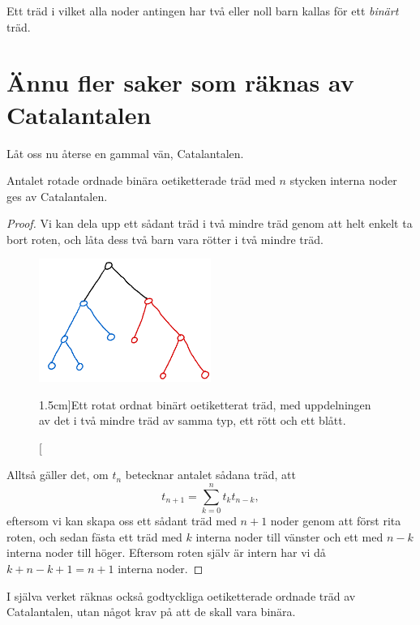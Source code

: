 \documentclass[nobib]{tufte-handout}
\begin{document}
\begin{definition}
    Ett träd i vilket alla noder antingen har två eller noll barn kallas för ett \emph{binärt} träd.
\end{definition}

\section{Ännu fler saker som räknas av Catalantalen}

Låt oss nu återse en gammal vän, Catalantalen.

\begin{proposition}\label{prop:ROBUT_count}
    Antalet rotade ordnade binära oetiketterade träd med $n$ stycken interna noder ges av Catalantalen.

    \begin{proof}
        Vi kan dela upp ett sådant träd i två mindre träd genom att helt enkelt ta bort roten, och låta dess två barn vara rötter i två mindre träd.

        \begin{figure}
            \centering
            \includegraphics[width=0.5\textwidth]{graphics/RUBOTree_division.png}
            \caption[][1.5cm]{Ett rotat ordnat binärt oetiketterat träd, med uppdelningen av det i två mindre träd av samma typ, ett rött och ett blått.}
        \end{figure}

        Alltså gäller det, om $t_n$ betecknar antalet sådana träd, att
        $$t_{n+1} = \sum_{k=0}^{n} t_k t_{n-k},$$
        eftersom vi kan skapa oss ett sådant träd med $n+1$ noder genom att först rita roten, och sedan fästa ett träd med $k$ interna noder till vänster och ett med $n-k$ interna noder till höger. Eftersom roten själv är intern har vi då $k + n - k + 1 = n + 1$ interna noder.
    \end{proof}
\end{proposition}

I själva verket räknas också godtyckliga oetiketterade ordnade träd av Catalantalen, utan något krav på att de skall vara binära.
\end{document}

